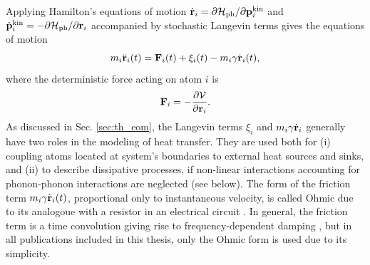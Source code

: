 Applying Hamilton's equations of motion $\dot{\mathbf{r}}_i=\partial \mathcal{H}_{\textrm{ph}}/\partial \mathbf{p}_i^{\textrm{kin}}$ and $\dot{\mathbf{p}}_i^{\textrm{kin}}=-\partial \mathcal{H}_{\textrm{ph}}/\partial \mathbf{r}_i$ \cite{fetter} accompanied by stochastic Langevin terms \cite{dhar06} gives the equations of motion
\begin{equation}
 m_i \ddot{\mathbf{r}}_i(t) = \mathbf{F}_i(t) + \xi_i(t) - m_i \gamma \dot{\mathbf{r}}_i(t), \label{eq:th_eom}
\end{equation}
where the deterministic force acting on atom $i$ is
\begin{equation}
 \mathbf{F}_i = - \frac{\partial \mathcal{V}}{\partial \mathbf{r}_i}. \label{eq:th_force}
\end{equation}
As discussed in Sec. \ref{sec:th_eom}, the Langevin terms $\xi_i$ and $m_i\gamma \dot{\mathbf{r}}_i$ generally have two roles in the modeling of heat transfer. They are used both for (i) coupling atoms located at system's boundaries to external heat sources and sinks,  and (ii) to describe dissipative processes, if non-linear interactions accounting for phonon-phonon interactions are neglected (see below). The form of the friction term $m_i \gamma \dot{\mathbf{r}}_i(t)$, proportional only to instantaneous velocity, is called Ohmic due to its analogoue with a resistor in an electrical circuit \cite{weiss}. In general, the friction term is a time convolution giving rise to frequency-dependent damping \cite{weiss}, but in all publications included in this thesis, only the Ohmic form is used due to its simplicity.

